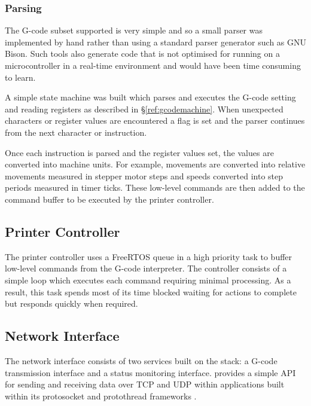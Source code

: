 			\subsubsection{Parsing}
				
				The G-code subset supported is very simple and so a small parser was
				implemented by hand rather than using a standard parser generator such
				as GNU Bison. Such tools also generate code that is not optimised for
				running on a microcontroller in a real-time environment and would have
				been time consuming to learn.
				
				A simple state machine was built which parses and executes the G-code
				setting and reading registers as described in \S\ref{ref:gcodemachine}.
				When unexpected characters or register values are encountered a flag is
				set and the parser continues from the next character or instruction.
				
				Once each instruction is parsed and the register values set, the values
				are converted into machine units. For example, movements are converted
				into relative movements measured in stepper motor steps and speeds
				converted into step periods measured in timer ticks. These low-level
				commands are then added to the command buffer to be executed by the
				printer controller.
		
		\subsection{Printer Controller}
			
			The printer controller uses a FreeRTOS queue in a high priority task to
			buffer low-level commands from the G-code interpreter. The controller
			consists of a simple loop which executes each command requiring minimal
			processing. As a result, this task spends most of its time blocked waiting
			for actions to complete but responds quickly when required.
		
		\subsection{Network Interface}
			
			The network interface consists of two services built on the \uIP{} stack:
			a G-code transmission interface and a status monitoring interface. \uIP{}
			provides a simple API for sending and receiving data over TCP and UDP
			within applications built within its protosocket and protothread
			frameworks \cite{uIP}.
			
